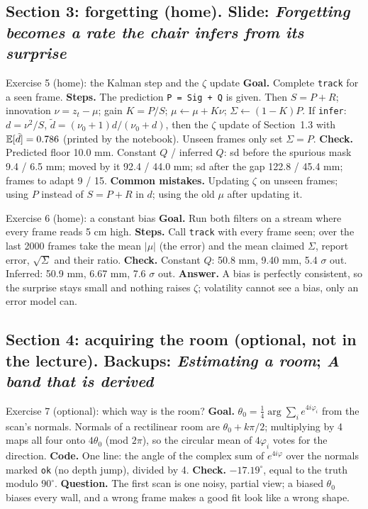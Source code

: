 \documentclass[11pt]{article}
\begin{document}
\subsection*{Section 3: forgetting (home). Slide: \emph{Forgetting becomes a rate the chair infers from its surprise}}

\begin{labhelp}{Exercise 5 (home): the Kalman step and the $\zeta$ update}
\textbf{Goal.} Complete \texttt{track} for a seen frame. \textbf{Steps.} The prediction \texttt{P = Sig + Q} is given. Then $S=P+R$; innovation $\nu=z_t-\mu$; gain $K=P/S$; $\mu\leftarrow\mu+K\nu$; $\Sigma\leftarrow(1-K)P$. If \texttt{infer}: $d=\nu^2/S$, $\tilde d=(\nu_0+1)d/(\nu_0+d)$, then the $\zeta$ update of Section~1.3 with $\mathbb{E}[\tilde d]=0.786$ (printed by the notebook). Unseen frames only set $\Sigma=P$. \textbf{Check.} Predicted floor 10.0 mm. Constant $Q$ / inferred $Q$: sd before the spurious mask 9.4 / 6.5 mm; moved by it 92.4 / 44.0 mm; sd after the gap 122.8 / 45.4 mm; frames to adapt 9 / 15. \textbf{Common mistakes.} Updating $\zeta$ on unseen frames; using $P$ instead of $S=P+R$ in $d$; using the old $\mu$ after updating it.
\end{labhelp}

\begin{labhelp}{Exercise 6 (home): a constant bias}
\textbf{Goal.} Run both filters on a stream where every frame reads 5 cm high. \textbf{Steps.} Call \texttt{track} with every frame seen; over the last 2000 frames take the mean $|\mu|$ (the error) and the mean claimed $\Sigma$, report error, $\sqrt{\Sigma}$ and their ratio. \textbf{Check.} Constant $Q$: 50.8 mm, 9.40 mm, 5.4 $\sigma$ out. Inferred: 50.9 mm, 6.67 mm, 7.6 $\sigma$ out. \textbf{Answer.} A bias is perfectly consistent, so the surprise stays small and nothing raises $\zeta$; volatility cannot see a bias, only an error model can.
\end{labhelp}

\subsection*{Section 4: acquiring the room (optional, not in the lecture). Backups: \emph{Estimating a room}; \emph{A band that is derived}}

\begin{labhelp}{Exercise 7 (optional): which way is the room?}
\textbf{Goal.} $\theta_0=\tfrac14\arg\sum_ie^{4i\varphi_i}$ from the scan's normals. Normals of a rectilinear room are $\theta_0+k\pi/2$; multiplying by 4 maps all four onto $4\theta_0$ (mod $2\pi$), so the circular mean of $4\varphi_i$ votes for the direction. \textbf{Code.} One line: the angle of the complex sum of $e^{4i\varphi}$ over the normals marked \texttt{ok} (no depth jump), divided by 4. \textbf{Check.} $-17.19^\circ$, equal to the truth modulo $90^\circ$. \textbf{Question.} The first scan is one noisy, partial view; a biased $\theta_0$ biases every wall, and a wrong frame makes a good fit look like a wrong shape.
\end{labhelp}
\end{document}
